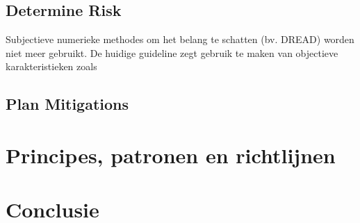 \documentclass[../main.tex]{subfiles}
\begin{document}
\subsection{Determine Risk}
Subjectieve numerieke methodes om het belang te schatten (bv. DREAD) worden niet meer gebruikt. De huidige guideline zegt gebruik te maken van objectieve karakteristieken zoals 

\subsection{Plan Mitigations}
 

\section{Principes, patronen en richtlijnen}
\section{Conclusie}
\end{document}
